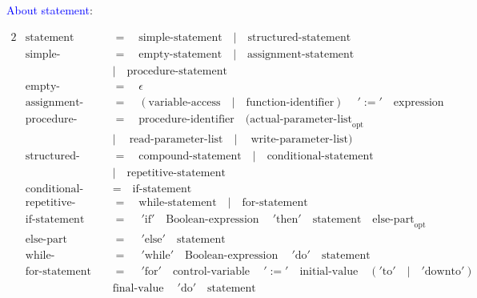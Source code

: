 \documentclass{article}
\begin{document}
\textcolor{blue}{About statement}:

\begin{alignat*}{2}
&\text{statement}\quad&&=\quad\text{simple-statement}\quad |\quad \text{structured-statement}\\
&\text{simple-statement}\quad&&=\quad\text{empty-statement}\quad |\quad \text{assignment-statement}\\
&&&|\quad \text{procedure-statement}\\
&\text{empty-statement}\quad&&=\quad\epsilon\\
&\text{assignment-statement}\quad&&=\quad(\text{variable-access}\quad|\quad\text{function-identifier})\quad\ ':='\quad\text{expression}\\
&\text{procedure-statement}\quad&&=\quad\text{procedure-identifier}\quad(\text{actual-parameter-list}_\text{opt}\\
&&& |\quad\ \text{read-parameter-list}\quad|\quad\ \text{write-parameter-list})\\
&\text{structured-statement}\quad&&=\quad\text{compound-statement}\quad|\quad\text{conditional-statement}\\
&&&|\quad\text{repetitive-statement}\\
&\text{conditional-statement}\quad&&=\quad\text{if-statement}\\
&\text{repetitive-statement}\quad&&=\quad\text{while-statement}\quad|\quad\text{for-statement}\\
&\text{if-statement}\quad&&=\quad\ '\text{if}'\quad\text{Boolean-expression}\quad\ '\text{then}'\quad\text{statement}\quad\text{else-part}_\text{opt}\\
&\text{else-part}\quad&&=\quad\ '\text{else}'\quad\text{statement}\\
&\text{while-statement}\quad&&=\quad\ '\text{while}'\quad\text{Boolean-expression}\quad\ '\text{do}'\quad\text{statement}\\
&\text{for-statement}\quad&&=\quad\ '\text{for}'\quad\text{control-variable}\quad\ ':='\quad\text{initial-value}\quad('\text{to}'\quad|\quad'\text{downto}')\\
&&&\text{final-value}\quad\ '\text{do}'\quad\text{statement}\\
\end{alignat*}
\end{document}
